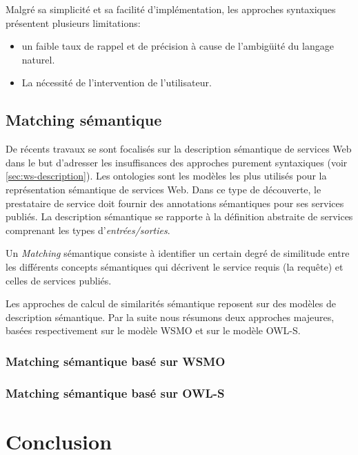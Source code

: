   Malgré sa simplicité et sa facilité d'implémentation, les approches
  syntaxiques présentent plusieurs limitations:

  \begin{itemize}
  \item un faible taux de rappel et de précision à cause de
    l'ambigüité du langage naturel.
  \item La nécessité de l'intervention de l'utilisateur.
  \end{itemize}

  \subsection{Matching sémantique}
  \label{sec:matching-semanique}
  De récents travaux se sont focalisés sur la description sémantique
  de services Web dans le but d'adresser les insuffisances des
  approches purement syntaxiques (voir \ref{sec:ws-description}). Les
  ontologies sont les modèles les plus utilisés pour la représentation
  sémantique de services Web. Dans ce type de découverte, le
  prestataire de service doit fournir des annotations sémantiques pour
  ses services publiés. La description sémantique se rapporte à la
  définition abstraite de services comprenant les types
  d'\textit{entrées/sorties}.

  Un \textit{Matching} sémantique consiste à identifier un certain
  degré de similitude entre les différents concepts sémantiques qui
  décrivent le service requis (la requête) et celles de services
  publiés.

  Les approches de calcul de similarités sémantique reposent sur des
  modèles de description sémantique. Par la suite nous résumons deux
  approches majeures, basées respectivement sur le modèle
  \textsc{WSMO} et sur le modèle \textsc{OWL-S}.

    \subsubsection{Matching sémantique basé sur WSMO}
    \label{sec:match-wsmo}
    \cite{paolucci2002semantic, keller2004wsmo}

    \subsubsection{Matching sémantique basé sur OWL-S}
    \label{sec:match-owls}
    \cite{paolucci2002semantic,benatallah2003request,
        benatallah2005automating, martin2004owl}

\section{Conclusion}


